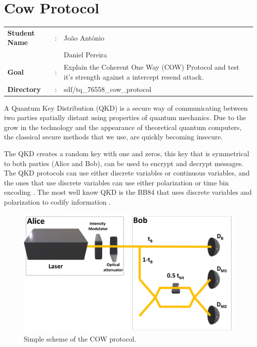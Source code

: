 \clearpage
\section{Cow Protocol}

\begin{refsection}

\begin{tcolorbox}	
\begin{tabular}{p{2.75cm} p{0.2cm} p{10.5cm}} 	
\textbf{Student Name}  &:&  Jo\~ao Ant\'onio\\
\textbf{}  & &  Daniel Pereira\\
\textbf{Goal}          &:& Explain the Coherent One Way (COW) Protocol and test it's strength against a intercept resend attack.\\
\textbf{Directory}              &:& sdf/tq_76558_cow_protocol
\end{tabular}
\end{tcolorbox}

A Quantum Key Distribution (QKD) is a secure way of communicating between two parties spatially distant using properties of quantum mechanics. Due to the grow in the technology and the appearance of theoretical quantum computers, the classical secure methods that we use, are quickly becoming insecure.

The QKD creates a random key with one and zeros, this key that is symmetrical to both parties (Alice and Bob), can be used to encrypt and decrypt messages. The QKD protocols can use either discrete variables or continuous variables, and the ones that use discrete variables can use either polarization or time bin encoding \cite{singh}. The most well know QKD is the BB84 that uses discrete variables and polarization to codify information \cite{bennett1992quantum}.

\begin{figure}[h]
\centering
\includegraphics[width=1\linewidth]{./sdf/tq_76558_cow_protocol/slides/figures/Full2.pdf}
\caption{Simple scheme of the COW protocol.}
\label{fig:Scheme}
\end{figure}


\end{refsection}
